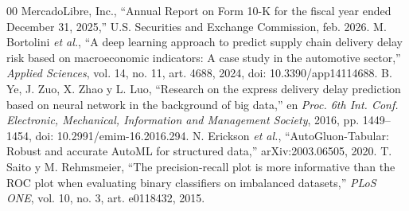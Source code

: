 \documentclass[conference]{IEEEtran}
\begin{document}
\begin{thebibliography}{00}
 MercadoLibre, Inc., ``Annual Report on Form 10-K for the
fiscal year ended December 31, 2025,'' U.S. Securities and Exchange
Commission, feb. 2026.
 M. Bortolini \textit{et al.}, ``A deep learning approach to
predict supply chain delivery delay risk based on macroeconomic indicators: A
case study in the automotive sector,'' \textit{Applied Sciences}, vol. 14,
no. 11, art. 4688, 2024, doi: 10.3390/app14114688.
 B. Ye, J. Zuo, X. Zhao y L. Luo, ``Research on the express
delivery delay prediction based on neural network in the background of big
data,'' en \textit{Proc. 6th Int. Conf. Electronic, Mechanical, Information
and Management Society}, 2016, pp. 1449--1454, doi: 10.2991/emim-16.2016.294.
 N. Erickson \textit{et al.}, ``AutoGluon-Tabular: Robust
and accurate AutoML for structured data,'' arXiv:2003.06505, 2020.
 T. Saito y M. Rehmsmeier, ``The precision-recall plot is more
informative than the ROC plot when evaluating binary classifiers on imbalanced
datasets,'' \textit{PLoS ONE}, vol. 10, no. 3, art. e0118432, 2015.
\end{thebibliography}
\end{document}
